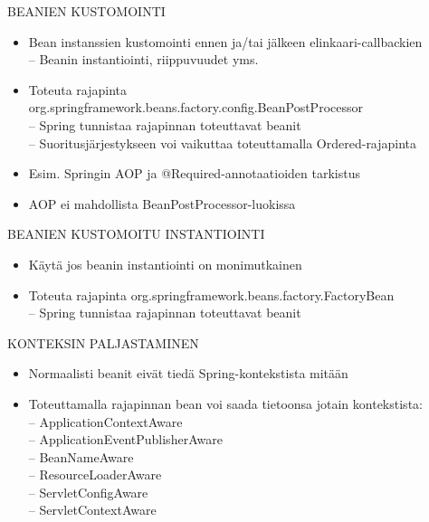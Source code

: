 \documentclass[hyperref={pdfauthor=\AUTHOR},14pt]{beamer}
\begin{document}
\begin{frame}[t, fragile]{BEANIEN KUSTOMOINTI}
\begin{itemize}
 \item Bean instanssien kustomointi ennen ja/tai jälkeen elinkaari-callbackien\\
 -- Beanin instantiointi, riippuvuudet yms.
 \item Toteuta rajapinta org.springframework.beans.factory.config.BeanPostProcessor\\
 -- Spring tunnistaa rajapinnan toteuttavat beanit\\
 -- Suoritusjärjestykseen voi vaikuttaa toteuttamalla Ordered-rajapinta\\
 \item Esim. Springin AOP ja @Required-annotaatioiden tarkistus 
 \item AOP ei mahdollista BeanPostProcessor-luokissa
\end{itemize}
\end{frame}
\begin{frame}[t, fragile]{BEANIEN KUSTOMOITU INSTANTIOINTI}
\begin{itemize}
 \item Käytä jos beanin instantiointi on monimutkainen
 \item Toteuta rajapinta org.springframework.beans.factory.FactoryBean\\
 -- Spring tunnistaa rajapinnan toteuttavat beanit
\end{itemize}
\end{frame}
\begin{frame}[t, fragile]{KONTEKSIN PALJASTAMINEN}
\begin{itemize}
\item Normaalisti beanit eivät tiedä Spring-kontekstista mitään
 \item Toteuttamalla rajapinnan bean voi saada tietoonsa jotain kontekstista:\\
 -- ApplicationContextAware \\
 -- ApplicationEventPublisherAware \\
 -- BeanNameAware \\
 -- ResourceLoaderAware \\
 -- ServletConfigAware \\
 -- ServletContextAware \\
\end{itemize}
\end{frame}
\end{document}
